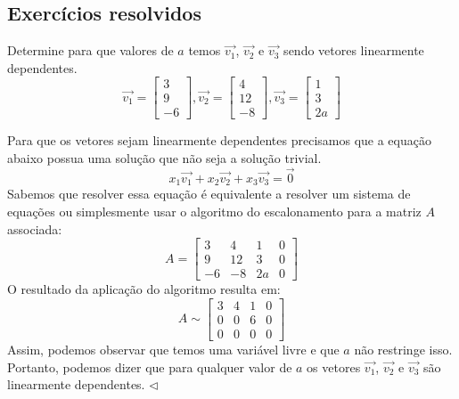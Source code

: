 \subsection*{Exercícios resolvidos}

\construirExeresol

\begin{exeresol}
Determine para que valores de $a$ temos $\vec{v_1}$, $\vec{v_2}$ e $\vec{v_3}$ sendo vetores linearmente dependentes.
\begin{equation}
\vec{v_1} = 
\left[
\begin{array}{c}
	3 \\
	9 \\
	-6
\end{array}
\right],
\vec{v_2} = 
\left[
\begin{array}{c}
	4 \\
	12 \\
	-8
\end{array}
\right],
\vec{v_3} = 
\left[
\begin{array}{c}
	1 \\
	3 \\
	2a
\end{array}
\right]
\end{equation}
\end{exeresol}
\begin{resol}
Para que os vetores sejam linearmente dependentes precisamos que a equação abaixo possua uma solução que não seja a solução trivial.
\begin{equation}
	x_1\vec{v_1} + x_2\vec{v_2} + x_3\vec{v_3} = \vec{0}
\end{equation}
Sabemos que resolver essa equação é equivalente a resolver um sistema de equações ou simplesmente usar o algoritmo do escalonamento para a matriz $A$ associada:
\begin{equation}
A = \left[
  \begin{array}{cccc}
    3 & 4 & 1 & 0 \\
    9 & 12 & 3 & 0  \\
    -6 & -8 & 2a & 0  
  \end{array}
\right]
\end{equation}
O resultado da aplicação do algoritmo resulta em:
\begin{equation}
A \sim \left[
\begin{array}{cccc}
  3 & 4 & 1 & 0 \\
  0 & 0 & 6 & 0 \\
  0 & 0 & 0 & 0
\end {array}
\right]
\end{equation}
Assim, podemos observar que temos uma variável livre e que $a$ não restringe isso. Portanto, podemos dizer que para qualquer valor de $a$ os vetores $\vec{v_1}$, $\vec{v_2}$ e $\vec{v_3}$ são linearmente dependentes. $\lhd$
\end{resol}

